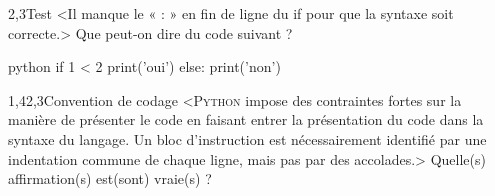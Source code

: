 
\begin{quiz}[title={Conditionnelles et syntaxe}]
\vspace{-\baselineskip}
\begin{quizquestion*}[b]{1}{2,3}{Test}
<Il manque le « {\ttfamily :} » en fin de ligne du {\ttfamily if} pour que la syntaxe soit correcte.> 
Que peut-on dire du code suivant ?
\begin{listingbox}{python}
if 1 < 2
    print('oui')
else:
    print('non')
\end{listingbox}
\end{quizquestion*}

\begin{quizquestion}[b]{1,4}{2,3}{Convention de codage}
<\textsc{Python} impose des contraintes fortes sur la manière de présenter le code en faisant entrer la présentation du code dans la syntaxe du langage. Un bloc d'instruction est nécessairement identifié par une indentation commune de chaque ligne, mais pas par des accolades.>
Quelle(s) affirmation(s) est(sont) vraie(s) ?
\end{quizquestion}
\end{quiz}

